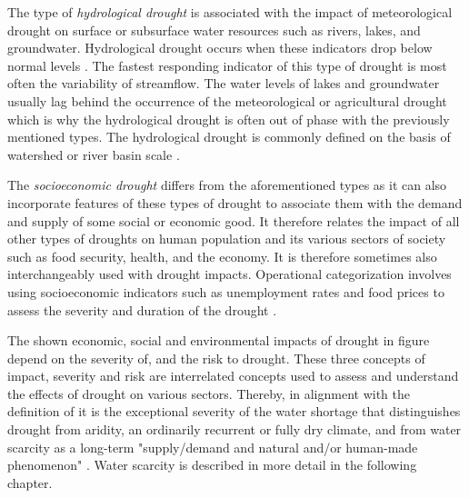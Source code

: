 The type of \textit{hydrological drought} is associated with the impact of meteorological drought on surface or subsurface water resources such as rivers, lakes, and groundwater. Hydrological drought occurs when these indicators drop below normal levels \autocite{palmerMeteorologicalDrought1965}. The fastest responding indicator of this type of drought is most often the variability of streamflow. The water levels of lakes and groundwater usually lag behind the occurrence of the meteorological or agricultural drought which is why the hydrological drought is often out of phase with the previously mentioned types. The hydrological drought is commonly defined on the basis of watershed or river basin scale \autocite{baltiReviewDroughtMonitoring2020,nationaldroughtmitigationcenterTypesDrought,wilhiteUnderstandingDroughtPhenomenon1985}.

The \textit{socioeconomic drought} differs from the aforementioned types as it can also incorporate features of these types of drought to associate them with the demand and supply of some social or economic good. It therefore relates the impact of all other types of droughts on human population and its various sectors of society such as food security, health, and the economy. It is therefore sometimes also interchangeably used with drought impacts. Operational categorization involves using socioeconomic indicators such as unemployment rates and food prices to assess the severity and duration of the drought \autocite{nationaldroughtmitigationcenterTypesDrought,wilhiteUnderstandingDroughtPhenomenon1985}.


The shown economic, social and environmental impacts of drought in figure  depend on the severity of, and the risk to drought. These three concepts of impact, severity and risk are interrelated concepts used to assess and understand the effects of drought on various sectors. Thereby, in alignment with the definition of \autocite{vanloonDroughtHumanmodifiedWorld2016} it is the exceptional severity of the water shortage that distinguishes drought from aridity, an ordinarily recurrent or fully dry climate, and from water scarcity as a long-term "supply/demand and natural and/or human-made phenomenon" \autocites[7]{idmpDroughtWaterScarcity2022}{vereintenationenSpecialReportDrought2021, vanClimatologicalRiskDroughts2017}. Water scarcity is described in more detail in the following chapter.

